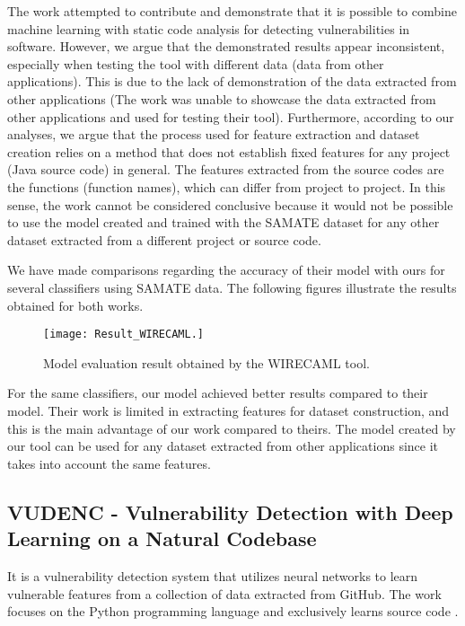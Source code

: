 The work attempted to contribute and demonstrate that it is possible to combine machine learning with static code analysis for detecting vulnerabilities in software. However, we argue that the demonstrated results appear inconsistent, especially when testing the tool with different data (data from other applications). This is due to the lack of demonstration of the data extracted from other applications (The work was unable to showcase the data extracted from other applications and used for testing their tool). Furthermore, according to our analyses, we argue that the process used for feature extraction and dataset creation relies on a method that does not establish fixed features for any project (Java source code) in general. The features extracted from the source codes are the functions (function names), which can differ from project to project. In this sense, the work cannot be considered conclusive because it would not be possible to use the model created and trained with the SAMATE dataset for any other dataset extracted from a different project or source code.

We have made comparisons regarding the accuracy of their model with ours for several classifiers using SAMATE data. The following figures illustrate the results obtained for both works.

\newpage

\begin{figure}[ht]	
	\centering
	\texttt{[image: Result\_WIRECAML.]}
	  \caption{Model evaluation result obtained by the WIRECAML tool.}
  \label{fig:bibtex}
\end{figure}

For the same classifiers, our model achieved better results compared to their model. Their work is limited in extracting features for dataset construction, and this is the main advantage of our work compared to theirs. The model created by our tool can be used for any dataset extracted from other applications since it takes into account the same features.




\subsection{VUDENC - Vulnerability Detection with Deep Learning on a Natural Codebase} %
\label{sub:related_work_vudenc}

It is a vulnerability detection system that utilizes neural networks to learn vulnerable features from a collection of data extracted from GitHub. The work focuses on the Python programming language and exclusively learns source code \cite{Wartschinski2019}. 

